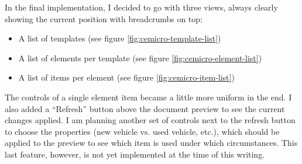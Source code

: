 In the final implementation, I decided to go with three views, always clearly showing the current position with breadcrumbs on top:

\begin{itemize}
  \item A list of templates (see figure \ref{fig:cemicro-template-list})
  \item A list of elements per template (see figure \ref{fig:cemicro-element-list})
  \item A list of items per element (see figure \ref{fig:cemicro-item-list})
\end{itemize}

The controls of a single element item became a little more uniform in the end. I also added a ``Refresh'' button above the document preview to see the current changes applied. I am planning another set of controls next to the refresh button to choose the properties (new vehicle vs. used vehicle, etc.), which should be applied to the preview to see which item is used under which circumstances. This last feature, however, is not yet implemented at the time of this writing.

